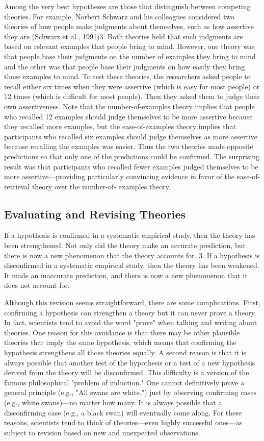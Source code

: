 Among the very best hypotheses are those that distinguish between competing theories. For example, Norbert Schwarz and his colleagues considered two theories of how people make judgments about themselves, such as how assertive they are (Schwarz et al., 1991)3. Both theories held that such judgments are based on relevant examples that people bring to mind. However, one theory was that people base their judgments on the number of examples they bring to mind and the other was that people base their judgments on how easily they bring those examples to mind. To test these theories, the researchers asked people to recall either six times when they were assertive (which is easy for most people) or 12 times (which is difficult for most people). Then they asked them to judge their own assertiveness. Note that the number-of-examples theory implies that people who recalled 12 examples should judge themselves to be more assertive because they recalled more examples, but the ease-of-examples theory implies that participants who recalled six examples should judge themselves as more assertive because recalling the examples was easier. Thus the two theories made opposite predictions so that only one of the predictions could be confirmed. The surprising result was that participants who recalled fewer examples judged themselves to be more assertive---providing particularly convincing evidence in favor of the ease-of-retrieval theory over the number-of- examples theory.

\subsection{Evaluating and Revising Theories}


If a hypothesis is confirmed in a systematic empirical study, then the theory has been strengthened. Not only did the theory make an accurate prediction, but there is now a new phenomenon that the theory accounts for.
3. If a hypothesis is disconfirmed in a systematic empirical study, then the theory has been weakened. It made an inaccurate prediction, and there is now a new phenomenon that it does not account for.


Although this revision seems straightforward, there are some complications. First, confirming a hypothesis can strengthen a theory but it can never prove a theory. In fact, scientists tend to avoid the word "prove" when talking and writing about theories. One reason for this avoidance is that there may be other plausible theories that imply the same hypothesis, which means that confirming the hypothesis strengthens all those theories equally. A second reason is that it is always possible that another test of the hypothesis or a test of a new hypothesis derived from the theory will be disconfirmed. This difficulty is a version of the famous philosophical "problem of induction." One cannot definitively prove a general principle (e.g., "All swans are white.") just by observing confirming cases (e.g., white swans)---no matter how many. It is always possible that a disconfirming case (e.g., a black swan) will eventually come along. For these reasons, scientists tend to think of theories---even highly successful ones---as subject to revision based on new and unexpected observations.


